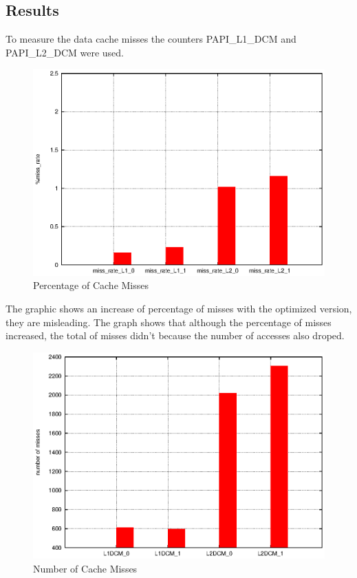 \documentclass[twoside]{article}
\begin{document}
\begin{multicols}{2}

\section{Results}

To measure the data cache misses the counters PAPI\_L1\_DCM and PAPI\_L2\_DCM were used.

\begin{figure}[!htp]
	\centering
	\begin{minipage}[t]{0.5\linewidth}
		\includegraphics[width=\textwidth]{images/caches.eps}
		\caption{Percentage of Cache Misses \label{fig:cache1}}
	\end{minipage}
\end{figure}

The \href{fig:cache1} graphic shows an increase of percentage of misses with the optimized version, they are misleading. The \href{fig:cache2} graph shows that although the percentage of misses increased, the total of misses didn't because the number of accesses also droped.

\begin{figure}[!htp]
	\centering
	\begin{minipage}[t]{0.5\linewidth}
		\includegraphics[width=\textwidth]{images/misses.eps}
		\caption{Number of Cache Misses \label{fig:cache2}}
	\end{minipage}
\end{figure} 


\end{multicols}
\end{document}
